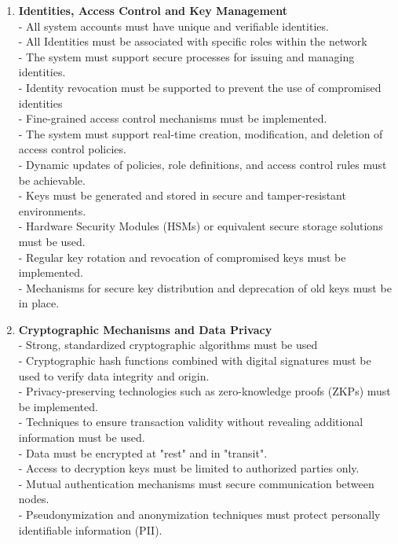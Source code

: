 \begin{enumerate}[label=(\arabic*)]	
	\item\textbf{Identities, Access Control and Key Management}\\
	- All system accounts must have unique and verifiable identities.\\
	- All Identities must be associated with specific roles within the network\\
	- The system must support secure processes for issuing and managing identities.\\
	- Identity revocation must be supported to prevent the use of compromised identities\\
	- Fine-grained access control mechanisms must be implemented.\\
	- The system must support real-time creation, modification, and deletion of access control policies.\\
	- Dynamic updates of policies, role definitions, and access control rules must be achievable.\\
	- Keys must be generated and stored in secure and tamper-resistant environments.\\
	- Hardware Security Modules (HSMs) or equivalent secure storage solutions must be used.\\
	- Regular key rotation and revocation of compromised keys must be implemented.\\
	- Mechanisms for secure key distribution and deprecation of old keys must be in place.\\
	
	\item\textbf{Cryptographic Mechanisms and Data Privacy}\\
	- Strong, standardized cryptographic algorithms must be used\\
	- Cryptographic hash functions combined with digital signatures must be used to verify data integrity and origin.\\
	- Privacy-preserving technologies such as zero-knowledge proofs (ZKPs) must be implemented.\\
	- Techniques to ensure transaction validity without revealing additional information must be used.\\ 
	- Data must be encrypted at "rest" and in "transit".\\
	- Access to decryption keys must be limited to authorized parties only.\\
	- Mutual authentication mechanisms must secure communication between nodes.\\
	- Pseudonymization and anonymization techniques must protect personally identifiable information (PII).\\
	

\end{enumerate}
